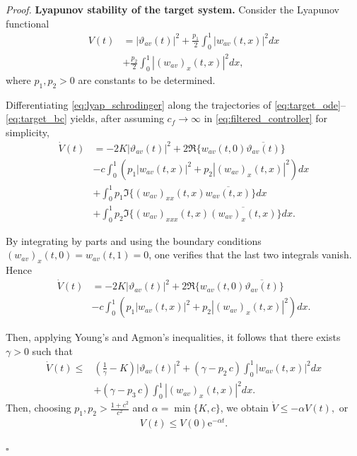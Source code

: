 \documentclass[letterpaper, 10 pt, conference]{ieeeconf}  %
\newenvironment{pf}
{\noindent\textit{Proof.}\hspace{1.2mm}}
{\hspace{\fill}$\square$}
\begin{document}
\begin{pf}
\textbf{Lyapunov stability of the target system.} Consider the Lyapunov functional
\begin{align}
    V(t) &= |\vartheta_{av}(t)|^{2} + \frac{p_{1}}{2}\!\int_{0}^{1}\!|w_{av}(t,x)|^{2}dx \nonumber\\
    & + \frac{p_{2}}{2}\!\int_{0}^{1}\!|(w_{av})_{x}(t,x)|^{2}dx,
    \label{eq:lyap_schrodinger}
\end{align}
where $p_{1},p_{2}>0$ are constants to be determined.

Differentiating \eqref{eq:lyap_schrodinger} along the trajectories of 
\eqref{eq:target_ode}–\eqref{eq:target_bc} yields, after assuming $c_f\to\infty$ in \eqref{eq:filtered_controller} for simplicity,
\begin{align}
    \dot{V}(t) &= -2K|\vartheta_{av}(t)|^{2}
    + 2\Re\{w_{av}(t,0)\overline{\vartheta_{av}(t)}\}
    \nonumber\\
    &- c\!\int_{0}^{1}\!(p_{1}|w_{av}(t,x)|^{2}+p_{2}|(w_{av})_{x}(t,x)|^{2})dx \nonumber\\
    & + \int_{0}^{1}\!\!p_{1}\Im\{(w_{av})_{xx}(t,x)\overline{w_{av}(t,x)}\}dx\nonumber\\
    & +\int_{0}^{1}\!\! p_{2}\Im\{(w_{av})_{xxx}(t,x)\overline{(w_{av})_{x}(t,x)}\}dx.
    \label{eq:diff_lyap_schrodinger}
\end{align}

By integrating by parts and using the boundary conditions 
$(w_{av})_{x}(t,0)=w_{av}(t,1)=0$, one verifies that the last two integrals vanish. Hence
\begin{align*}
    \dot{V}(t)
    &= -2K|\vartheta_{av}(t)|^{2}
    + 2\Re\{w_{av}(t,0)\overline{\vartheta_{av}(t)}\}\\
    &- c\!\int_{0}^{1}\!(p_{1}|w_{av}(t,x)|^{2}+p_{2}|(w_{av})_{x}(t,x)|^{2})dx. 
\end{align*}

Then, applying Young's and Agmon's inequalities, it follows that there exists $\gamma > 0$ such that
\begin{align*}
    \dot{V}(t) \leq& \left(\frac{1}{\gamma}-K\right)|\vartheta_{av} (t)|^{2}+\left(\gamma-p_{2}\,c\right)\int_{0}^{1}|w_{av}(t,x)|^{2}dx\\
    & + \left(\gamma-p_{3}\,c\right)\int_{0}^{1}|(w_{av})_{x}(t,x)|^{2}dx.
\end{align*}
    Then, choosing $p_{1},p_{2}>\frac{1+c^2}{c^{2}}$ and $\alpha = \min \{K, c\}$, we obtain $\dot{V}\leq -\alpha V(t),$ or
    \begin{align}
        V(t)\leq V(0)\mathrm{e}^{-\alpha t}.\label{eq:lyap_inequality}
    \end{align}


\end{pf}
\end{document}

